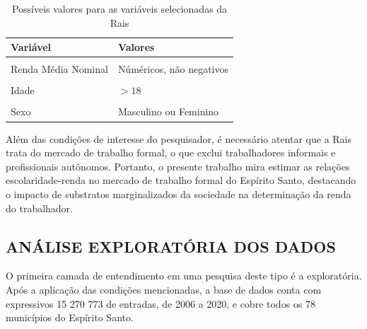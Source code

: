 \documentclass[
  12pt,
  letterpaper,
  DIV=11,
  numbers=noendperiod]{scrartcl}
\begin{document}
\begin{table}
\caption{Possíveis valores para as variáveis selecionadas da Rais}\tabularnewline

\centering\begingroup\fontsize{10}{12}\selectfont

\begin{tabular}[t]{l>{\raggedright\arraybackslash}p{30em}}
\toprule
Variável & Valores\\
\midrule
\cellcolor{gray!6}{Sigla UF} & \cellcolor{gray!6}{ES}\\
Renda Média Nominal & Núméricos, não negativos\\
\cellcolor{gray!6}{Ciclo de Escolaridade} & \cellcolor{gray!6}{Analfabeto, Ensino Fundamental (I/II, completo/incompleto),  Ensino Médio (completo/incompleto), Ensino Superior (completo/incompleto), Mestrado ou Doutorado}\\
Idade & $>18$\\
\cellcolor{gray!6}{Raça/Cor} & \cellcolor{gray!6}{Branco, Preto, Pardo, Indígena ou Amarelo}\\
\addlinespace
Sexo & Masculino ou Feminino\\
\bottomrule
\end{tabular}
\endgroup{}
\end{table}

Além das condições de interesse do pesquisador, é necessário atentar que
a Rais trata do mercado de trabalho formal, o que exclui trabalhadores
informais e profissionais autônomos. Portanto, o presente trabalho mira
estimar as relações escolaridade-renda no mercado de trabalho formal do
Espírito Santo, destacando o impacto de substratos marginalizados da
sociedade na determinação da renda do trabalhador.

\hypertarget{anuxe1lise-exploratuxf3ria-dos-dados}{%
\subsection{ANÁLISE EXPLORATÓRIA DOS
DADOS}\label{anuxe1lise-exploratuxf3ria-dos-dados}}

O primeira camada de entendimento em uma pesquisa deste tipo é a
exploratória. Após a aplicação das condições mencionadas, a base de
dados conta com expressivos 15 270 773 de entradas, de 2006 a 2020, e
cobre todos os 78 municípios do Espírito Santo.
\end{document}
